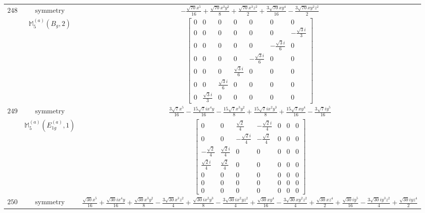 \documentclass[fleqn,8pt,landscape]{jsarticle}
\begin{document}
\begin{longtable}{ccc}
$ 248 $ & $ \text{symmetry} $ & $ - \frac{\sqrt{70} x^{5}}{16} + \frac{\sqrt{70} x^{3} y^{2}}{8} + \frac{\sqrt{70} x^{3} z^{2}}{2} + \frac{3 \sqrt{70} x y^{4}}{16} - \frac{3 \sqrt{70} x y^{2} z^{2}}{2} $ \\
$  $ & $ \mathbb{M}_{5}^{(a)}(B_{g},2) $ & $ \begin{bmatrix} 0 & 0 & 0 & 0 & 0 & 0 & 0 \\ 0 & 0 & 0 & 0 & 0 & 0 & - \frac{\sqrt{3} i}{3} \\ 0 & 0 & 0 & 0 & 0 & - \frac{\sqrt{3} i}{6} & 0 \\ 0 & 0 & 0 & 0 & - \frac{\sqrt{3} i}{6} & 0 & 0 \\ 0 & 0 & 0 & \frac{\sqrt{3} i}{6} & 0 & 0 & 0 \\ 0 & 0 & \frac{\sqrt{3} i}{6} & 0 & 0 & 0 & 0 \\ 0 & \frac{\sqrt{3} i}{3} & 0 & 0 & 0 & 0 & 0 \end{bmatrix} $ \\ \hline
$ 249 $ & $ \text{symmetry} $ & $ \frac{3 \sqrt{7} x^{5}}{16} - \frac{15 \sqrt{7} i x^{4} y}{16} - \frac{15 \sqrt{7} x^{3} y^{2}}{8} + \frac{15 \sqrt{7} i x^{2} y^{3}}{8} + \frac{15 \sqrt{7} x y^{4}}{16} - \frac{3 \sqrt{7} i y^{5}}{16} $ \\
$  $ & $ \mathbb{M}_{5}^{(a)}(E_{1g}^{(a)},1) $ & $ \begin{bmatrix} 0 & 0 & \frac{\sqrt{2}}{4} & - \frac{\sqrt{2} i}{4} & 0 & 0 & 0 \\ 0 & 0 & - \frac{\sqrt{2} i}{4} & - \frac{\sqrt{2}}{4} & 0 & 0 & 0 \\ - \frac{\sqrt{2}}{4} & \frac{\sqrt{2} i}{4} & 0 & 0 & 0 & 0 & 0 \\ \frac{\sqrt{2} i}{4} & \frac{\sqrt{2}}{4} & 0 & 0 & 0 & 0 & 0 \\ 0 & 0 & 0 & 0 & 0 & 0 & 0 \\ 0 & 0 & 0 & 0 & 0 & 0 & 0 \\ 0 & 0 & 0 & 0 & 0 & 0 & 0 \end{bmatrix} $ \\ \hline
$ 250 $ & $ \text{symmetry} $ & $ \frac{\sqrt{30} x^{5}}{16} + \frac{\sqrt{30} i x^{4} y}{16} + \frac{\sqrt{30} x^{3} y^{2}}{8} - \frac{3 \sqrt{30} x^{3} z^{2}}{4} + \frac{\sqrt{30} i x^{2} y^{3}}{8} - \frac{3 \sqrt{30} i x^{2} y z^{2}}{4} + \frac{\sqrt{30} x y^{4}}{16} - \frac{3 \sqrt{30} x y^{2} z^{2}}{4} + \frac{\sqrt{30} x z^{4}}{2} + \frac{\sqrt{30} i y^{5}}{16} - \frac{3 \sqrt{30} i y^{3} z^{2}}{4} + \frac{\sqrt{30} i y z^{4}}{2} $ \\

\end{longtable}
\end{document}
